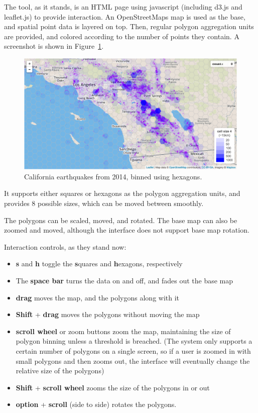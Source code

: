 \documentclass{article}\usepackage[]{graphicx}\usepackage[]{color}
\begin{document}
The tool, as it stands, is an HTML page using javascript (including d3.js and leaflet.js) to provide interaction. An OpenStreetMaps map is used as the base, and spatial point data is layered on top. Then, regular polygon aggregation units are provided, and colored according to the number of points they contain. A screenshot is shown in Figure~\ref{tool}.

\begin{figure}[htbp]
\begin{centering}
\includegraphics[width=\textwidth]{../img/tool.png}
\caption{California earthquakes from 2014, binned using hexagons.}\label{tool}
\end{centering}
\end{figure}

It supports either squares or hexagons as the polygon aggregation units, and provides 8 possible sizes, which can be moved between smoothly. 

The polygons can be scaled, moved, and rotated. The base map can also be zoomed and moved, although the interface does not support base map rotation. 

Interaction controls, as they stand now:
\begin{itemize}
\item \textbf{s} and \textbf{h} toggle the \textbf{s}quares and \textbf{h}exagons, respectively
\item The \textbf{space bar} turns the data on and off, and fades out the base map
\item \textbf{drag} moves the map, and the polygons along with it
\item \textbf{Shift} + \textbf{drag} moves the polygons without moving the map
\item \textbf{scroll wheel} or zoom buttons zoom the map, maintaining the size of polygon binning unless a threshold is breached. (The system only supports a certain number of polygons on a single screen, so if a user is zoomed in with small polygons and then zooms out, the interface will eventually change the relative size of the polygons)
\item \textbf{Shift} + \textbf{scroll wheel} zooms the size of the polygons in or out
\item \textbf{option} + \textbf{scroll} (side to side) rotates the polygons. 
\end{itemize}
\end{document}
